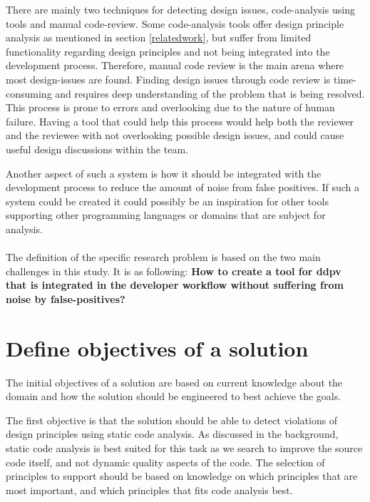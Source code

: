 \documentclass{report}
\begin{document}
There are mainly two techniques for detecting design issues, code-analysis using tools and manual code-review. Some code-analysis tools offer design principle analysis as mentioned in section \ref{relatedwork}, but suffer from limited functionality regarding design principles and not being integrated into the development process. Therefore, manual code review is the main arena where most design-issues are found. Finding design issues through code review is time-consuming and requires deep understanding of the problem that is being resolved. This process is prone to errors and overlooking due to the nature of human failure. Having a tool that could help this process would help both the reviewer and the reviewee with not overlooking possible design issues, and could cause useful design discussions within the team.

Another aspect of such a system is how it should be integrated with the development process to reduce the amount of noise from false positives. If such a system could be created it could possibly be an inspiration for other tools supporting other programming languages or domains that are subject for analysis. \\

\\ The definition of the specific research problem is based on the two main challenges in this study. It is as following: \textbf{How to create a tool for \gls{ddpv} that is integrated in the developer workflow without suffering from noise by false-positives?}


\section{Define objectives of a solution}
\label{objectives-of-solution}


The initial objectives of a solution are based on current knowledge about the domain and how the solution should be engineered to best achieve the goals. 

The first objective is that the solution should be able to detect violations of design principles using static code analysis. As discussed in the background, static code analysis is best suited for this task as we search to improve the source code itself, and not dynamic quality aspects of the code. The selection of principles to support should be based on knowledge on which principles that are most important, and which principles that fits code analysis best. 
\end{document}
